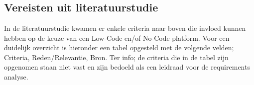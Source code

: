 \chapter{}%
\label{ch:vereisten}
\section{Vereisten uit literatuurstudie}%
\label{sec:vereisten-literatuurstudie}
In de literatuurstudie kwamen er enkele criteria naar boven die invloed kunnen hebben op 
de keuze van een Low-Code en/of No-Code platform. Voor een duidelijk overzicht is hieronder een tabel opgesteld met de volgende velden; 
Criteria, Reden/Relevantie, Bron. Ter info; de criteria die in de tabel zijn opgenomen 
staan niet vast en zijn bedoeld als een leidraad voor de requirements analyse.
